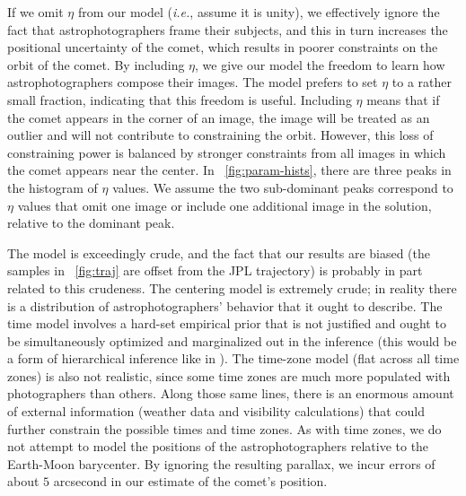 \documentclass[12pt,preprint]{aastex}
\newcommand{\foreign}[1]{\emph{#1}}
\newcommand{\ie}{\foreign{i.e.}}
\newcommand{\figref}[1]{\figurename~\ref{#1}}
\begin{document}

If we omit $\eta$ from our model (\ie, assume it is unity), we
effectively ignore the fact that astrophotographers frame their
subjects, and this in turn increases the positional uncertainty of the
comet, which results in poorer constraints on the orbit of the comet.
By including $\eta$, we give our model the freedom to learn how
astrophotographers compose their images.  The model prefers to set
$\eta$ to a rather small fraction, indicating that this freedom is
useful.  Including $\eta$ means that if the comet appears in the
corner of an image, the image will be treated as an outlier and will
not contribute to constraining the orbit.  However, this loss of
constraining power is balanced by stronger constraints from all images
in which the comet appears near the center.  In
\figref{fig:param-hists}, there are three peaks in the histogram of
$\eta$ values.  We assume the two sub-dominant peaks correspond to
$\eta$ values that omit one image or include one additional image in
the solution, relative to the dominant peak.

The model is exceedingly crude, and the fact that our results are
biased (the samples in \figref{fig:traj} are offset from the JPL
trajectory) is probably in part related to this crudeness.  The
centering model is extremely crude; in reality there is a distribution
of astrophotographers' behavior that it ought to describe.  The time
model involves a hard-set empirical prior that is not justified and
ought to be simultaneously optimized and marginalized out in the
inference (this would be a form of hierarchical inference like in
\citealt{hierarchical}).  The time-zone model (flat across all time
zones) is also not realistic, since some time zones are much more
populated with photographers than others.  Along those same lines,
there is an enormous amount of external information (weather data and
visibility calculations) that could further constrain the possible
times and time zones.  As with time zones, we do not attempt to model
the positions of the astrophotographers relative to the Earth-Moon
barycenter.  By ignoring the resulting parallax, we incur errors of
about $5$ arcsecond in our estimate of the comet's position.
\end{document}
